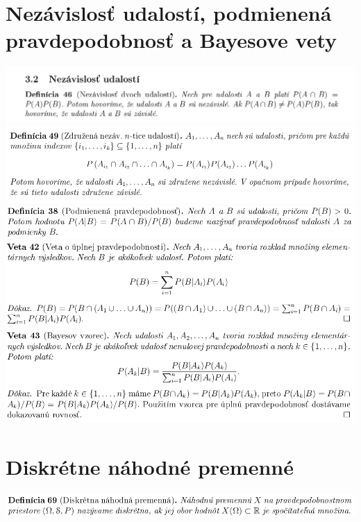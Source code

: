 \section{Nezávislosť udalostí, podmienená pravdepodobnosť a Bayesove vety}

\includegraphics[width=1\textwidth]{images/pravdepodobnost/nezav_ud}\\
\includegraphics[width=1\textwidth]{images/pravdepodobnost/zdruz_nezav}\\
\includegraphics[width=1\textwidth]{images/pravdepodobnost/podmien_pravd}\\
\includegraphics[width=1\textwidth]{images/pravdepodobnost/upln_pravd}\\

\section{Diskrétne náhodné premenné}

\includegraphics[width=1\textwidth]{images/pravdepodobnost/disk_nah_prem}\\
